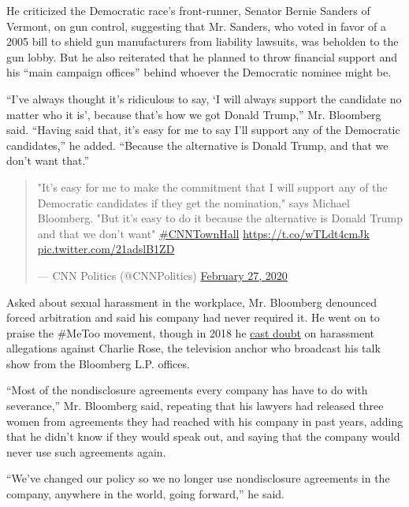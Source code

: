 He criticized the Democratic race's front-runner, Senator Bernie Sanders
of Vermont, on gun control, suggesting that Mr. Sanders, who voted in
favor of a 2005 bill to shield gun manufacturers from liability
lawsuits, was beholden to the gun lobby. But he also reiterated that he
planned to throw financial support and his ``main campaign offices''
behind whoever the Democratic nominee might be.

``I've always thought it's ridiculous to say, `I will always support the
candidate no matter who it is', because that's how we got Donald
Trump,'' Mr. Bloomberg said. ``Having said that, it's easy for me to say
I'll support any of the Democratic candidates,'' he added. ``Because the
alternative is Donald Trump, and that we don't want that.''

\begin{quote}
"It's easy for me to make the commitment that I will support any of the
Democratic candidates if they get the nomination," says Michael
Bloomberg. "But it's easy to do it because the alternative is Donald
Trump and that we don't want"
\href{https://twitter.com/hashtag/CNNTownHall?src=hash\&ref_src=twsrc\%5Etfw}{\#CNNTownHall}
\url{https://t.co/wTLdt4cmJk}
\href{https://t.co/21adslB1ZD}{pic.twitter.com/21adslB1ZD}

--- CNN Politics (@CNNPolitics)
\href{https://twitter.com/CNNPolitics/status/1232830906479599617?ref_src=twsrc\%5Etfw}{February
27, 2020}
\end{quote}

Asked about sexual harassment in the workplace, Mr. Bloomberg denounced
forced arbitration and said his company had never required it. He went
on to praise the \#MeToo movement, though in 2018 he
\href{https://www.nytimes3xbfgragh.onion/2018/09/17/us/politics/bloomberg-president-2020-democrat.html}{cast
doubt} on harassment allegations against Charlie Rose, the television
anchor who broadcast his talk show from the Bloomberg L.P. offices.

``Most of the nondisclosure agreements every company has have to do with
severance,'' Mr. Bloomberg said, repeating that his lawyers had released
three women from agreements they had reached with his company in past
years, adding that he didn't know if they would speak out, and saying
that the company would never use such agreements again.

``We've changed our policy so we no longer use nondisclosure agreements
in the company, anywhere in the world, going forward,'' he said.

